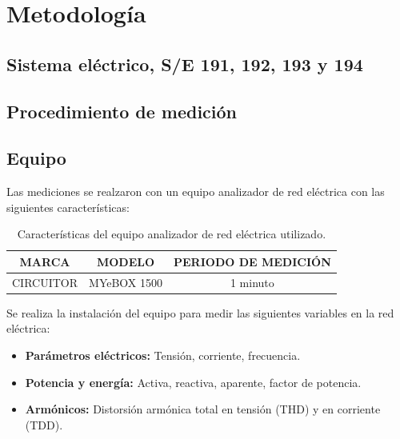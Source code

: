 \chapter{Metodología} \label{sec:Metodos}


\section{Sistema eléctrico, S/E 191, 192, 193 y 194}


\section{Procedimiento de medición}


\section{Equipo}


Las mediciones se realzaron con un equipo analizador de red eléctrica con las siguientes características:

\begin{table}[H]
\begin{center}
\begin{tabular}{| c | c | c |}
 \hline
    \textbf{MARCA}    & \textbf{MODELO} & \textbf{PERIODO DE MEDICIÓN} \\  
 \hline
      CIRCUITOR       &   MYeBOX 1500   &        1 minuto              \\
 \hline
\end{tabular}
\caption{Características del equipo analizador de red eléctrica utilizado.}
\label{Table:Caract_MYeBOX}
\end{center}
\end{table}

Se realiza la instalación del equipo para medir las siguientes variables en la red eléctrica:

\begin{itemize}
    \item \textbf{Parámetros eléctricos:} Tensión, corriente, frecuencia.
    \item \textbf{Potencia y energía:} Activa, reactiva, aparente, factor de potencia.
    \item \textbf{Armónicos:} Distorsión armónica total en tensión (THD) y en corriente (TDD).
\end{itemize} 

